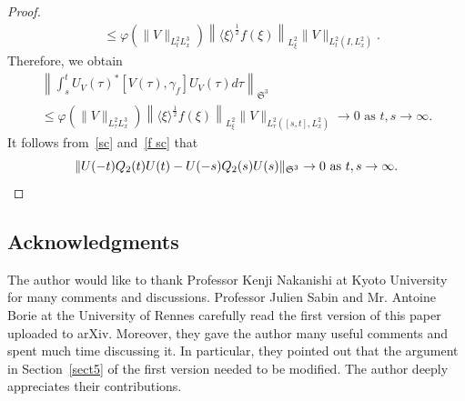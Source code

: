 \documentclass[AHL,Unicode,longabstracts,MathTools,published]{cedram}
\newcommand{\FS}{\mathfrak{S}}
\newcommand{\ga}{\gamma}
\newcommand{\ph}{\varphi}
\newcommand{\ta}{\tau}
\renewcommand{\No}[1]{\left\| #1 \right\|}
\newcommand{\I}{\infty}
\newcommand{\lxr}{\langle \xi \rangle}
\newcommand{\tw}{\frac{1}{2}}
\begin{document}
\begin{proof}
\begin{equation}
\begin{split}
&\le \ph\left(\|V\|_{L^2_t L^3_x}\right) \left\|\lxr^\tw f(\xi)\right\|_{L^2_\xi} \|V\|_{L^2_t(I,L^2_x)}.
\end{split}
\end{equation}
Therefore, we obtain
\begin{multline}\label{f sc}
\No{ \int_s^t U_V(\ta)^*[V(\ta),\ga_f] U_V(\ta) d\ta }_{\FS^3} \\
\le \ph\left(\|V\|_{L^2_\ta L^3_x}\right) \left\|\lxr^\tw f(\xi)\right\|_{L^2_\xi} \|V\|_{L^2_\ta\left([s,t],L^2_x\right)} 
\to 0 \text{ as } t,s \to \I. 
\end{multline}
It follows from~\eqref{sc} and~\eqref{f sc} that
\begin{equation}
\|U(-t)Q_2(t)U(t)-U(-s)Q_2(s)U(s)\|_{\FS^3} \to 0 \text{ as } t,s \to \I. \qedhere
\end{equation}
\end{proof}



\subsection*{Acknowledgments}

The author would like to thank Professor Kenji Nakanishi at Kyoto University for many comments and discussions. Professor Julien Sabin and Mr. Antoine Borie at the University of Rennes carefully read the first version of this paper uploaded to arXiv. Moreover, they gave the author many useful comments and spent much time discussing it. In particular, they pointed out that the argument in Section~\ref{sect5} of the first version needed to be modified. The author deeply appreciates their contributions.




\end{document}
